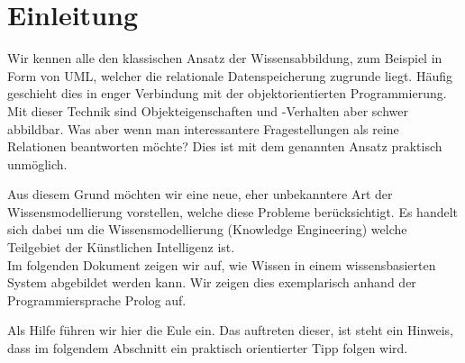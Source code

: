 \chapter{Einleitung}
\label{chap:einleitung}
Wir kennen alle den klassischen Ansatz der Wissensabbildung, zum Beispiel in Form von UML, welcher die relationale Datenspeicherung zugrunde liegt. Häufig geschieht dies in enger Verbindung mit der objektorientierten Programmierung. Mit dieser Technik sind Objekteigenschaften und -Verhalten aber schwer abbildbar. Was aber wenn man interessantere Fragestellungen als reine Relationen beantworten möchte? Dies ist mit dem genannten Ansatz praktisch unmöglich.  

Aus diesem Grund möchten wir eine neue, eher unbekanntere Art der Wissensmodellierung vorstellen, welche diese Probleme berücksichtigt. Es handelt sich dabei um die Wissensmodellierung (Knowledge Engineering) welche Teilgebiet der Künstlichen Intelligenz ist. \\
Im folgenden Dokument zeigen wir auf, wie Wissen in einem wissensbasierten System abgebildet werden kann. Wir zeigen dies exemplarisch anhand der Programmiersprache Prolog auf.

Als Hilfe führen wir hier die Eule ein. Das auftreten dieser, ist steht ein Hinweis, dass im folgendem Abschnitt ein praktisch orientierter Tipp folgen wird.



